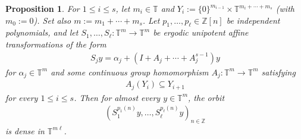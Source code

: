 \documentclass[10pt,a4paper]{amsart}
\newtheorem{proposition}{Proposition}
\newcommand{\T}{{\mathbb T}}
\newcommand{\Z}{{\mathbb Z}}
\begin{document}
\begin{proposition}\label{P: equidistribution for unipotent affine}
    For $1\leq i\leq s$, let $m_i\in\T$ and $Y_i := \{0\}^{m_{i-1}}\times \T^{m_{i}+ \cdots + m_s}$ (with $m_0:=0$). Set also $m:=m_1 + \cdots + m_s$.
    Let $p_1, \ldots, p_\ell\in\Z[n]$ be independent polynomials, and let $S_1, \ldots, S_\ell:\T^m\to\T^m$ be ergodic unipotent affine transformations of the form
    \begin{align*}
        S_jy = \alpha_j + (I+A_j + \cdots + A_j^{s-1})y
    \end{align*}
    for   $\alpha_{j}\in\T^{m}$ and some continuous group homomorphism $A_j:\T^m\to\T^m$ satisfying
    \begin{align}\label{E: shifting property of A}
     A_j(Y_i)\subseteq Y_{i+1}   
    \end{align}
    for every $1\leq i\leq s$.    
    Then for almost every $y\in\T^m$, the orbit
    \begin{align}%
        (S_1^{p_1(n)}y, \ldots, S_\ell^{p_\ell(n)}y)_{n\in\Z}
    \end{align}
    is dense in $\T^{m\ell}$.
\end{proposition}
\end{document}
